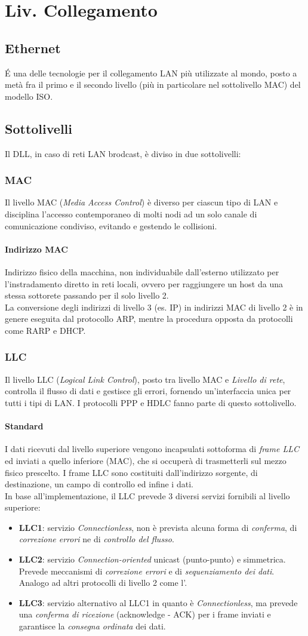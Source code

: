\documentclass[a4paper,11pt]{article}
\def\subsub#1{\subsubsection{#1}\label{#1}}
\def\para#1{\paragraph{#1}\label{#1}}
\def\vedi#1{\nameref{#1}}
\def\italic#1{\textit{#1}}
\begin{document}
\section{Liv. Collegamento}
\subsection{Ethernet}
\'E una delle tecnologie per il collegamento LAN più utilizzate al mondo, posto a metà fra il primo e il secondo livello (più in particolare nel sottolivello MAC) del modello ISO. 
\subsection{Sottolivelli}
Il DLL, in caso di reti LAN brodcast, è diviso in due sottolivelli:
\subsub{MAC} Il livello MAC (\textit{Media Access Control}) è diverso per ciascun tipo di LAN e disciplina l'accesso contemporaneo di molti nodi ad un solo canale di comunicazione condiviso, evitando e gestendo le collisioni. 
\para{Indirizzo MAC} Indirizzo fisico della macchina, non individuabile dall'esterno utilizzato per l'instradamento diretto in reti locali, ovvero per raggiungere un host da una stessa sottorete passando per il solo livello 2.\\La conversione degli indirizzi di livello 3 (es. IP) in indirizzi MAC di livello 2 è in genere eseguita dal protocollo ARP, mentre la procedura opposta da protocolli come RARP e DHCP.
\subsub{LLC} Il livello LLC (\italic{Logical Link Control}), posto tra livello MAC e \textit{Livello di rete}, controlla il flusso di dati e gestisce gli errori, fornendo un'interfaccia unica per tutti i tipi di LAN.
I protocolli PPP e HDLC fanno parte di questo sottolivello.
\para{Standard} I dati ricevuti dal livello superiore vengono incapsulati sottoforma di \textit{frame LLC} ed inviati a quello inferiore (MAC), che si occuperà di trasmetterli sul mezzo fisico prescelto. I frame LLC sono costituiti dall'indirizzo sorgente, di destinazione, un campo di controllo ed infine i dati.\\
In base all'implementazione, il LLC prevede 3 diversi servizi fornibili al livello superiore:
\begin{itemize}
\item \textbf{LLC1}: servizio \textit{Connectionless}, non è prevista alcuna forma di \textit{conferma}, di \textit{correzione errori} ne di \textit{controllo del flusso}.
\item \textbf{LLC2}: servizio \textit{Connection-oriented} unicast (punto-punto) e simmetrica. Prevede meccanismi di \textit{correzione errori} e di \textit{sequenziamento dei dati}. Analogo ad altri protocolli di livello 2 come l'\vedi{HDLC}.
\item \textbf{LLC3}: servizio alternativo al LLC1 in quanto è \textit{Connectionless}, ma prevede una \textit{conferma di ricezione} (acknowledge - ACK) per i frame inviati e garantisce la \textit{consegna ordinata} dei dati.
\end{itemize}
\end{document}
